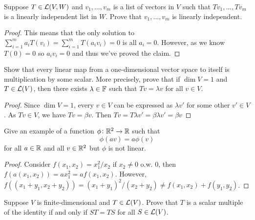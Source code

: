 \documentclass{extarticle}
\begin{document}
\begin{problem}{4}
    Suppose \(T \in \mathcal{L}(V, W)\) and \(v_1, \ldots, v_m\) is a list of vectors in \(V\) such that 
    \(T v_1, \ldots, T v_m\) is a linearly independent list in \(W\). Prove that \(v_1, \ldots, v_m\)
    is linearly independent. 
\end{problem}

\begin{proof}
This means that the only solution to \(\sum_{i=1}^{m} a_i T(v_i) = \sum_{i=1}^{m} T(a_i v_i) = 0\)
is all \(a_i = 0\). However, as we know \(T(0) = 0\) so \(a_i v_i = 0\) and thus we've proved the claim. 
\end{proof}


\begin{problem}{7}
    Show that every linear map from a one-dimensional vector space to itself is multiplication 
    by some scalar. More precisely, prove that if \(\dim V = 1\) and \(T \in \mathcal{L}(V)\), then 
    there exists \(\lambda \in \mathbb{F}\) such that \(T v = \lambda v\) for all \(v \in V\). 
\end{problem}

\begin{proof}
Since \(\dim V = 1\), every \(v \in V\) can be expressed as \(\lambda v'\) for some other \(v' \in V\). 
As \(Tv \in V\), we have \(Tv = \beta v\). Then \(T v = T \lambda v' = \beta \lambda v' = \beta v\)
\end{proof}

\begin{problem}{8}
    Give an example of a function \(\phi \colon \mathbb{R}^2 \to \mathbb{R}\) such that 
    \[\phi(av) = a\phi(v)\]
    for all \(a \in \mathbb{R}\) and all \(v \in \mathbb{R}^2\) but \(\phi\) is not linear. 
\end{problem}

\begin{proof}
Consider \(f(x_1, x_2) = x_1^2 / x_2\) if \(x_2 \neq 0\) o.w. 0, then \(f(a(x_1, x_2)) = a x_1^2 = a f(x_1, x_2)\). 
However, \(f((x_1 + y_1 , x_2 + y_2)) = (x_1 + y_1)^2 / (x_2 + y_2) \neq f(x_1, x_2) + f(y_1, y_2)\). 
\end{proof}

\begin{problem}{11}
    Suppose \(V\) is finite-dimensional and \(T \in \mathcal{L}(V)\). Prove that \(T\) is a scalar multiple 
    of the identity if and only if \(S T = TS\) for all \(S \in \mathcal{L}(V)\). 
\end{problem}
\end{document}
